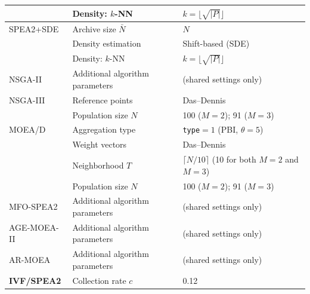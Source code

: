 \documentclass[pdflatex,sn-mathphys-ay]{sn-jnl}%
\theoremstyle{thmstyleone}%
\theoremstyle{thmstyletwo}%
\theoremstyle{thmstylethree}%
\begin{document}
\begin{table}[!htbp]
\begin{tabularx}{\textwidth}{@{} l X X @{}}
		                   & Density: $k$-NN                                & $k=\lfloor\sqrt{|P|}\rfloor$                                    \\
		\midrule
		SPEA2+SDE          & Archive size $\bar{N}$                         & $N$                                                             \\
		                   & Density estimation                             & Shift-based (SDE)                                               \\
		                   & Density: $k$-NN                                & $k=\lfloor\sqrt{|P|}\rfloor$                                    \\
		\midrule
		NSGA-II            & Additional algorithm parameters                & (shared settings only)                                          \\
		\midrule
		NSGA-III           & Reference points                               & Das--Dennis \citep{das1998normal}                               \\
		                   & Population size $N$                            & 100 ($M=2$); 91 ($M=3$)                                         \\
		\midrule
		MOEA/D             & Aggregation type                               & \texttt{type}$=1$ (PBI, $\theta{=}5$)                           \\
		                   & Weight vectors                                 & Das--Dennis                                                     \\
		                   & Neighborhood $T$                               & $\lceil N/10 \rceil$ (10 for both $M=2$ and $M=3$)              \\
		                   & Population size $N$                            & 100 ($M=2$); 91 ($M=3$)                                         \\
		\midrule
		MFO-SPEA2          & Additional algorithm parameters                & (shared settings only)                                          \\
		\midrule
		AGE-MOEA-II        & Additional algorithm parameters                & (shared settings only)                                          \\
		\midrule
		AR-MOEA            & Additional algorithm parameters                & (shared settings only)                                          \\
		\midrule
		\textbf{IVF/SPEA2} & Collection rate $c$                            & 0.12                                                            \\

\end{tabularx}
\end{table}
\end{document}
